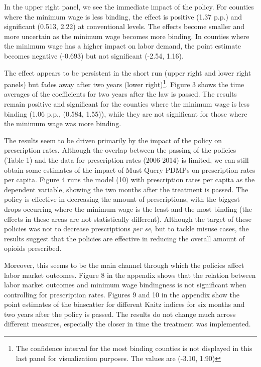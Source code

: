 \documentclass[12pt,a4paper]{article}
\begin{document}
In the upper right panel, we see the immediate impact of the policy.
For counties where the minimum wage is less binding, the effect is positive (1.37 p.p.) and significant (0.513, 2.22) at conventional levels.
The effects become smaller and more uncertain as the minimum wage becomes more binding.
In counties where the minimum wage has a higher impact on labor demand, the point estimate becomes negative (-0.693) but not significant (-2.54, 1.16).

The effect appears to be persistent in the short run (upper right and lower right panels) but fades away after two years (lower right)\footnote{The confidence interval for the most binding counties is not displayed in this last panel for visualization purposes. The values are (-3.10, 1.90)}.
Figure 3 shows the time averages of the coefficients for two years after the law is passed.
The results remain positive and significant for the counties where the minimum wage is less binding (1.06 p.p., (0.584, 1.55)), while they are not significant for those where the minimum wage was more binding.

The results seem to be driven primarily by the impact of the policy on prescription rates.
Although the overlap between the passing of the policies (Table 1) and the data for prescription rates (2006-2014) is limited, we can still obtain some estimates of the impact of Must Query PDMPs on prescription rates per capita.
Figure 4 runs the model (10) with prescription rates per capita as the dependent variable, showing the two months after the treatment is passed.
The policy is effective in decreasing the amount of prescriptions, with the biggest drops occurring where the minimum wage is the least and the most binding (the effects in these areas are not statistically different).
Although the target of these policies was not to decrease prescriptions \textit{per se}, but to tackle misuse cases, the results suggest that the policies are effective in reducing the overall amount of opioids prescribed.

Moreover, this seems to be the main channel through which the policies affect labor market outcomes.
Figure 8 in the appendix shows that the relation between labor market outcomes and minimum wage bindingness is not significant when controlling for prescription rates.
Figures 9 and 10 in the appendix show the point estimates of the binscatter for different Kaitz indices for six months and two years after the policy is passed.
The results do not change much across different measures, especially the closer in time the treatment was implemented.
\end{document}
